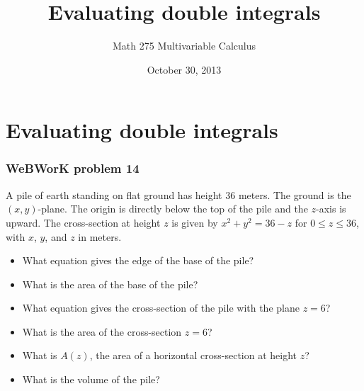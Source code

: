 \documentclass[11pt,ignorenonframetext,aspectratio=169,xcolor={svgnames}]{beamer}
\title{Evaluating double integrals}
\author{Math 275 Multivariable Calculus}
\date{October 30, 2013}
\begin{document}
\frame{\titlepage}

\section{Evaluating double integrals}

\begin{frame}\frametitle{WeBWorK problem 14}

A pile of earth standing on flat ground has height $36$ meters. The
ground is the $(x,y)$-plane. The origin is directly below the top of the
pile and the $z$-axis is upward. The cross-section at height $z$ is
given by $x^2+y^2=36-z$ for $0 \leq z \leq 36$, with $x$, $y$, and $z$
in meters.

\begin{itemize}
\itemsep1pt\parskip0pt
\item
  What equation gives the edge of the base of the pile?
\item
  What is the area of the base of the pile?
\item
  What equation gives the cross-section of the pile with the plane
  $z = 6$?
\item
  What is the area of the cross-section $z = 6$?
\item
  What is $A(z)$, the area of a horizontal cross-section at height $z$?
\item
  What is the volume of the pile?
\end{itemize}

\end{frame}
\end{document}
